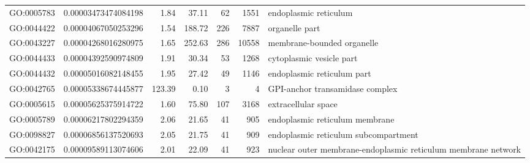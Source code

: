 \documentclass[letterpaper,12pt]{article}
\numberwithin{equation}{appendix}
\begin{document}
\begin{landscape}
{{\begin{longtable}{lrrrrrl}
  GO:0005783 & 0.00003473474084198 & 1.84 & 37.11 & 62 & 1551 & endoplasmic reticulum \\ 
  GO:0044422 & 0.00004067050253296 & 1.54 & 188.72 & 226 & 7887 & organelle part \\ 
  GO:0043227 & 0.00004268016280975 & 1.65 & 252.63 & 286 & 10558 & membrane-bounded organelle \\ 
  GO:0044433 & 0.00004392590974809 & 1.91 & 30.34 & 53 & 1268 & cytoplasmic vesicle part \\ 
  GO:0044432 & 0.00005016082148455 & 1.95 & 27.42 & 49 & 1146 & endoplasmic reticulum part \\ 
  GO:0042765 & 0.00005338674445877 & 123.39 & 0.10 & 3 & 4 & GPI-anchor transamidase complex \\ 
  GO:0005615 & 0.00005625375914722 & 1.60 & 75.80 & 107 & 3168 & extracellular space \\ 
  GO:0005789 & 0.00006217802294359 & 2.06 & 21.65 & 41 & 905 & endoplasmic reticulum membrane \\ 
  GO:0098827 & 0.00006856137520693 & 2.05 & 21.75 & 41 & 909 & endoplasmic reticulum subcompartment \\ 
  GO:0042175 & 0.00009589113074606 & 2.01 & 22.09 & 41 & 923 & nuclear outer membrane-endoplasmic reticulum membrane network \\ 
   \bottomrule
\end{longtable}
}}
\end{landscape}
\end{document}
